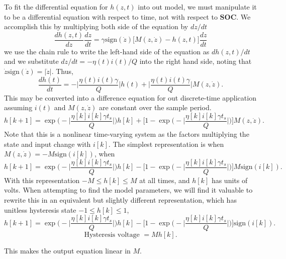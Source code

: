 \documentclass[11pt,a4paper,oneside]{book}
\numberwithin{equation}{section}
\newcommand{\abs}[1]{\big|#1\big|}
\newcommand{\sign}{\text{sign}}
\theoremstyle{it}
\theoremstyle{definition}
\begin{document}
To fit the differential equation for $h(z,t)$ into out model, we must manipulate it to be a differential equation with respect to time, not with respect to $\mathbf{SOC}$. We accomplish this by multiplying both side of the equation by $dz/dt$
\begin{equation}
	\frac{dh(z,t)}{dz}\frac{dz}{dt}=\gamma\sign(\dot{z})\Big[M(z,\dot{z})-h(z,t)\Big]\frac{dz}{dt}
\end{equation} 
we use the chain rule to write the left-hand side of the equation as $dh(z,t)/dt$ and we substitute $dz/dt = -\eta(t)i(t)/Q$ into the right hand side, noting that $\dot{z}\sign(\dot{z})=\abs{\dot{z}}$. Thus,
\begin{equation}
	\frac{dh(t)}{dt} = -\abs{\frac{\eta(t)i(t)\gamma}{Q}}h(t)+\abs{\frac{\eta(t)i(t)\gamma}{Q}}M(z,\dot{z}).
\end{equation}
This may be converted into a difference equation for out discrete-time application assuming $i(t)$ and $M(z,\dot{z})$ are constant over the sample period. 
\begin{equation}
	h[k+1] = \exp\Bigg(-\abs{\frac{\eta[k]i[k]\gamma t_s}{Q}}\Bigg)h[k] + \Bigg[1-\exp\Bigg(-\abs{\frac{\eta[k]i[k]\gamma t_s}{Q}}\Bigg)\Bigg]M(z,\dot{z}).
\end{equation}
Note that this is a nonlinear time-varying system as the factors multiplying the state and input change with $i[k]$.
The simplest representation is when $M(z,\dot{z})=-M\sign(i[k])$, when 
\begin{equation}
	h[k+1] = \exp\Bigg(-\abs{\frac{\eta[k]i[k]\gamma t_s}{Q}}\Bigg)h[k] - \Bigg[1-\exp\Bigg(-\abs{\frac{\eta[k]i[k]\gamma t_s}{Q}}\Bigg)\Bigg]M\sign(i[k]).
\end{equation}
With this representation $-M\le h[k] \le M$ at all times, and $h[k]$ has units of volts. When attempting to find the model parameters, we will find it valuable to rewrite this in an equivalent but slightly different representation, which has unitless hysteresis state $-1 \le h[k] \le 1$,
\begin{equation}
	h[k+1] = \exp\Bigg(-\abs{\frac{\eta[k]i[k]\gamma t_s}{Q}}\Bigg)h[k] - \Bigg[1-\exp\Bigg(-\abs{\frac{\eta[k]i[k]\gamma t_s}{Q}}\Bigg)\Bigg]\sign(i[k]).
\end{equation}
\begin{equation}
	\text{Hysteresis voltage } = Mh[k].
\end{equation}


This makes the output equation linear in $M$.
\end{document}

